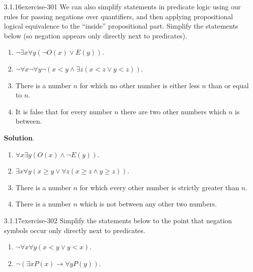 \documentclass[twoside,11pt,]{book}
\numberwithin{equation}{chapter}
\newcommand{\imp}{\rightarrow}
\newcommand{\lt}{<}
\begin{document}
\begin{divisionsolution}{3.1.16}{}{exercise-301}%
\hypertarget{p-3992}{}%
We can also simplify statements in predicate logic using our rules for passing negations over quantifiers, and then applying propositional logical equivalence to the ``inside'' propositional part. Simplify the statements below (so negation appears only directly next to predicates).\leavevmode%
\begin{enumerate}[label=(\alph*)]
\item\hypertarget{li-2083}{}\(\neg \exists x \forall y (\neg O(x) \vee E(y))\).%
\item\hypertarget{li-2084}{}\(\neg \forall x \neg \forall y \neg(x \lt y \wedge \exists z (x \lt z \vee y \lt z))\).%
\item\hypertarget{li-2085}{}\hypertarget{p-3993}{}%
There is a number \(n\) for which no other number is either less \(n\) than or equal to \(n\).%
\item\hypertarget{li-2086}{}\hypertarget{p-3994}{}%
It is false that for every number \(n\) there are two other numbers which \(n\) is between.%
\end{enumerate}
%
\par\smallskip%
\noindent\textbf{Solution}.\quad%
\hypertarget{p-3995}{}%
\leavevmode%
\begin{enumerate}[label=(\alph*)]
\item\hypertarget{li-2087}{}\(\forall x \exists y (O(x) \wedge \neg E(y))\).%
\item\hypertarget{li-2088}{}\(\exists x \forall y (x \ge y \vee \forall z (x \ge z \wedge y \ge z))\).%
\item\hypertarget{li-2089}{}\hypertarget{p-3996}{}%
There is a number \(n\) for which every other number is strictly greater than \(n\).%
\item\hypertarget{li-2090}{}\hypertarget{p-3997}{}%
There is a number \(n\) which is not between any other two numbers.%
\end{enumerate}
%
\end{divisionsolution}%
\begin{divisionsolution}{3.1.17}{}{exercise-302}%
\hypertarget{p-3998}{}%
Simplify the statements below to the point that negation symbols occur only directly next to predicates.\leavevmode%
\begin{enumerate}[label=(\alph*)]
\item\hypertarget{li-2091}{}\hypertarget{p-3999}{}%
\(\neg \forall x \forall y (x \lt y \vee y \lt x)\).%
\item\hypertarget{li-2092}{}\hypertarget{p-4000}{}%
\(\neg(\exists x P(x) \imp \forall y P(y))\).%
\end{enumerate}
%
\end{divisionsolution}%
\end{document}
